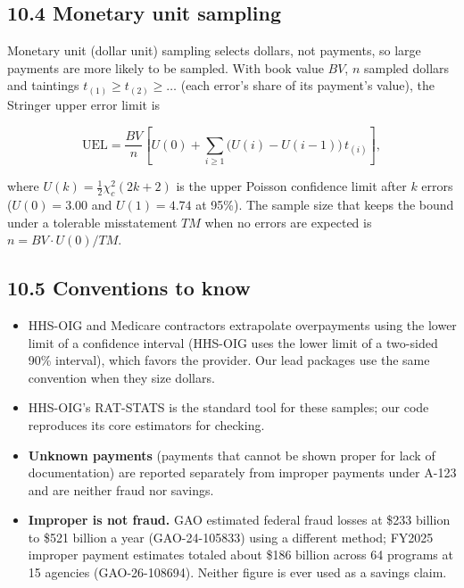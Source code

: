 \documentclass[letterpaper,11pt]{article}
\providecommand{\tightlist}{\setlength{\itemsep}{0pt}\setlength{\parskip}{0pt}}
\begin{document}
\hypertarget{monetary-unit-sampling}{%
\subsection*{10.4 Monetary unit sampling}\label{monetary-unit-sampling}}

Monetary unit (dollar unit) sampling selects dollars, not payments, so
large payments are more likely to be sampled. With book value \(BV\),
\(n\) sampled dollars and taintings \(t_{(1)} \ge t_{(2)} \ge \dots\)
(each error's share of its payment's value), the Stringer upper error
limit is

\[\text{UEL} = \frac{BV}{n}\left[U(0) + \sum_{i \ge 1} \big(U(i) - U(i-1)\big)\, t_{(i)}\right],\]

where \(U(k) = \tfrac{1}{2}\chi^2_{c}(2k + 2)\) is the upper Poisson
confidence limit after \(k\) errors (\(U(0) = 3.00\) and \(U(1) = 4.74\)
at 95\%). The sample size that keeps the bound under a tolerable
misstatement \(TM\) when no errors are expected is
\(n = BV \cdot U(0) / TM\).

\hypertarget{conventions-to-know}{%
\subsection*{10.5 Conventions to know}\label{conventions-to-know}}

\begin{itemize}
\tightlist
\item
  HHS-OIG and Medicare contractors extrapolate overpayments using the
  lower limit of a confidence interval (HHS-OIG uses the lower limit of
  a two-sided 90\% interval), which favors the provider. Our lead
  packages use the same convention when they size dollars.
\item
  HHS-OIG's RAT-STATS is the standard tool for these samples; our code
  reproduces its core estimators for checking.
\item
  \textbf{Unknown payments} (payments that cannot be shown proper for
  lack of documentation) are reported separately from improper payments
  under A-123 and are neither fraud nor savings.
\item
  \textbf{Improper is not fraud.} GAO estimated federal fraud losses at
  \$233 billion to \$521 billion a year (GAO-24-105833) using a
  different method; FY2025 improper payment estimates totaled about
  \$186 billion across 64 programs at 15 agencies (GAO-26-108694).
  Neither figure is ever used as a savings claim.
\end{itemize}
\end{document}
